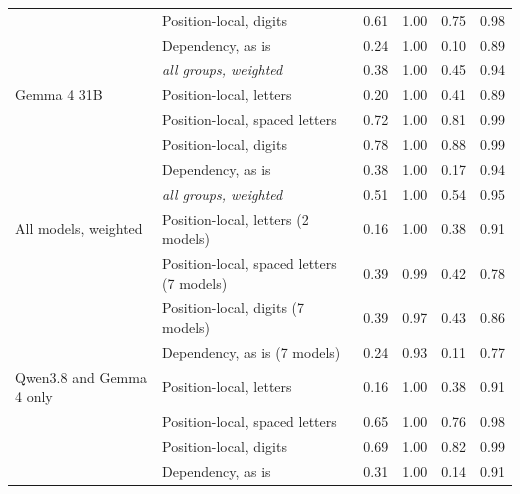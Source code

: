 \begin{tabular}{ll cc cc}
 & Position-local, digits & 0.61 & 1.00 & 0.75 & 0.98 \\
 & Dependency, as is & 0.24 & 1.00 & 0.10 & 0.89 \\
 & \emph{all groups, weighted} & 0.38 & 1.00 & 0.45 & 0.94 \\
\midrule
Gemma 4 31B & Position-local, letters & 0.20 & 1.00 & 0.41 & 0.89 \\
 & Position-local, spaced letters & 0.72 & 1.00 & 0.81 & 0.99 \\
 & Position-local, digits & 0.78 & 1.00 & 0.88 & 0.99 \\
 & Dependency, as is & 0.38 & 1.00 & 0.17 & 0.94 \\
 & \emph{all groups, weighted} & 0.51 & 1.00 & 0.54 & 0.95 \\
\midrule
All models, weighted & Position-local, letters (2 models) & 0.16 & 1.00 & 0.38 & 0.91 \\
 & Position-local, spaced letters (7 models) & 0.39 & 0.99 & 0.42 & 0.78 \\
 & Position-local, digits (7 models) & 0.39 & 0.97 & 0.43 & 0.86 \\
 & Dependency, as is (7 models) & 0.24 & 0.93 & 0.11 & 0.77 \\
\midrule
Qwen3.8 and Gemma 4 only & Position-local, letters & 0.16 & 1.00 & 0.38 & 0.91 \\
 & Position-local, spaced letters & 0.65 & 1.00 & 0.76 & 0.98 \\
 & Position-local, digits & 0.69 & 1.00 & 0.82 & 0.99 \\
 & Dependency, as is & 0.31 & 1.00 & 0.14 & 0.91 \\
\bottomrule
\end{tabular}
